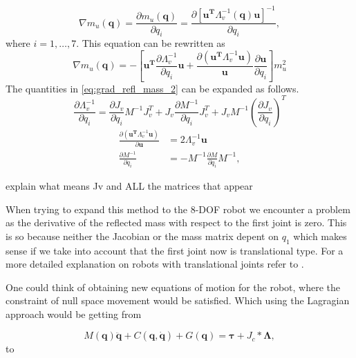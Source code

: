 \begin{equation}
\nabla m_u(\mathbf{q}) = 
\frac{\partial {m_u(\mathbf{q})}}{\partial {q_i}} = \frac{\partial {[\mathbf{u^T} \Lambda_{v}^{-1}(\mathbf{q}) \mathbf{u}]^{-1}}}{\partial {q_i}}, \label{eq:grad_refl_mass_1}
\end{equation}
where $i = 1, \dots, 7$. This equation can be rewritten as
\begin{equation}
\nabla m_u(\mathbf{q}) = - \left [ \mathbf{u^T} \frac{\partial {\Lambda_{v}^{-1}}}{\partial {q_i}} \mathbf{u} +
\frac{\partial {(\mathbf{u^T} \Lambda_{v}^{-1} \mathbf{u})}}{\mathbf{u}} \frac{\partial {\mathbf{u}}}{\partial {q_i}} \right ] m_u^2 \label{eq:grad_refl_mass_2}
\end{equation}
The quantities in \eqref{eq:grad_refl_mass_2} can be expanded as follows.
\begin{equation}
\frac{\partial {\Lambda_{v}^{-1}}}{\partial {q_i}} = \frac{\partial {J_v}}{\partial {q_i}} M^{-1} J_v^T + J_v \frac{\partial {M^{-1}}}{\partial {q_i}} J_v^T + J_v M^{-1} \left ( \frac{\partial {J_v}}{\partial {q_i}} \right )^T
\end{equation}
\begin{align}
\frac{\partial {(\mathbf{u^T} \Lambda_{v}^{-1} \mathbf{u})}}{\partial {\mathbf{u}}}& = 2 \Lambda_{v}^{-1} \mathbf{u} \\
\frac{\partial {M^{-1}}}{\partial {q_i}} & = -M^{-1} 
\frac{\partial {M}}{\partial {q_i}} M^{-1},
\end{align}

{\color{red} explain what means Jv and ALL the matrices that appear}

When trying to expand this method to the 8-DOF robot we encounter a problem as the derivative of the reflected mass with respect to the first joint is zero.
This is so because neither the Jacobian or the mass matrix depent on $q_1$ which makes sense if we take into account that the first joint now is translational type. For a more detailed explanation on robots with translational joints refer to \cite{cartesianrobot}.


One could think of obtaining new equations of motion for the robot, where the constraint of null space movement would be satisfied. Which using the Lagragian approach would be getting from 

\begin{equation}
M(\mathbf{q})\ddot{\mathbf{q}}+C(\mathbf{q},\dot{\mathbf{q}})+G(\mathbf{q})=\mathbf{\tau} +J_c*\mathbf{\Lambda},
\label{joint_space_dynamics}
\end{equation}	
to	

